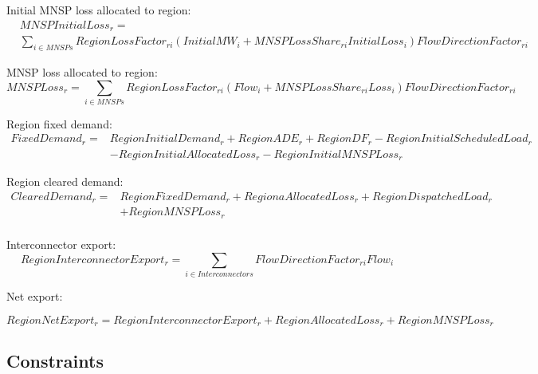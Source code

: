 \documentclass{article}
\begin{document}
Initial MNSP loss allocated to region:
\begin{equation}
\begin{split}
& MNSPInitialLoss_{r} = \\
& \sum\limits_{i \in MNSPs} RegionLossFactor_{ri} (InitialMW_{i} + MNSPLossShare_{ri} InitialLoss_{i}) FlowDirectionFactor_{ri}
\end{split}
\end{equation}

MNSP loss allocated to region:
\begin{equation}
MNSPLoss_{r} = \sum\limits_{i \in MNSPs} RegionLossFactor_{ri} (Flow_{i} + MNSPLossShare_{ri} Loss_{i}) FlowDirectionFactor_{ri}
\end{equation}

Region fixed demand:
\begin{equation}
\begin{split}
FixedDemand_{r} = & RegionInitialDemand_{r}  + RegionADE_{r} + RegionDF_{r} - RegionInitialScheduledLoad_{r} \\
& - RegionInitialAllocatedLoss_{r} - RegionInitialMNSPLoss_{r} 
\end{split}
\end{equation}


Region cleared demand:
\begin{equation}
\begin{split}
ClearedDemand_{r} = & RegionFixedDemand_{r} + RegionaAllocatedLoss_{r} + RegionDispatchedLoad_{r} \\
& + RegionMNSPLoss_{r}\\
\end{split}
\end{equation}

Interconnector export:
\begin{equation}
	RegionInterconnectorExport_{r} = \sum\limits_{i \in Interconnectors} FlowDirectionFactor_{ri} Flow_{i}
\end{equation}

Net export:

\begin{equation}
	RegionNetExport_{r} = RegionInterconnectorExport_{r} + RegionAllocatedLoss_{r} + RegionMNSPLoss_{r}
\end{equation}

\subsection{Constraints}
\end{document}
